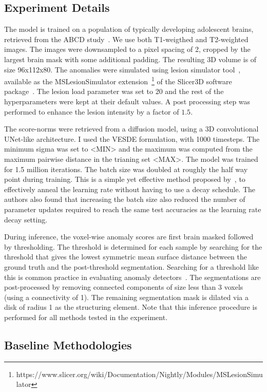 \subsection*{Experiment Details}
The model is trained on a population of typically developing adolescent brains, retrieved from the ABCD study~\cite{Casey2018adolescent}. We use both T1-weigthed and T2-weighted images. The images were downsampled to a pixel spacing of 2, cropped by the largest brain mask with some additional padding. The resulting 3D volume is of size 96x112x80. The anomalies were simulated using lesion simulator tool~\cite{Filho_2019}, available as the MSLesionSimulator extension~\footnote{https://www.slicer.org/wiki/Documentation/Nightly/Modules/MSLesionSimulator} of the Slicer3D software package~\cite{fedorov3DSlicerImage2012}. The lesion load parameter was set to 20 and the rest of the hyperparameters were kept at their default values. A post processing step was performed to enhance the lesion intensity by a factor of $1.5$.

The score-norms were retrieved from a diffusion model, using a 3D convolutional UNet-like architecture. I used the VESDE formulation, with 1000 timesteps. The minimum sigma was set to <MIN> and the maximum was computed from the maximum pairwise distance in the trianing set <MAX>. The model was trained for 1.5 million iterations. The batch size was doubled at roughly the half way point during training. This is a simple yet effective method proposed by~\cite{le2018dont}, to effectively anneal the learning rate without having to use a decay schedule. The authors also found that increasing the batch size also reduced the number of parameter updates required to reach the same test accuracies as the learning rate decay setting.

During inference, the voxel-wise anomaly scores are first brain masked followed by thresholding. The threshold is determined for each sample by searching for the threshold that gives the lowest symmetric mean surface distance between the ground truth and the post-threshold segmentation. Searching for a threshold like this is common practice in evaluating anomaly detectors~\cite{baur_deep_2019}. The segmentations are post-processed by removing connected components of size less than 3 voxels (using a connectivity of 1). The remaining segmentation mask is dilated via a disk of radius 1 as the structuring element. Note that this inference procedure is performed for all methods tested in the experiment.

\subsection*{Baseline Methodologies}

